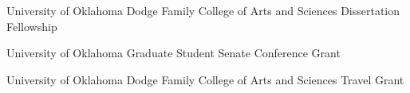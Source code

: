 {%
	University of Oklahoma}
{%
	Dodge Family College of Arts and Sciences Dissertation Fellowship}
{}

{%
	University of Oklahoma}
{%
	Graduate Student Senate Conference Grant}
{}


{%
	University of Oklahoma}
{%
	Dodge Family College of Arts and Sciences Travel Grant}
{}

